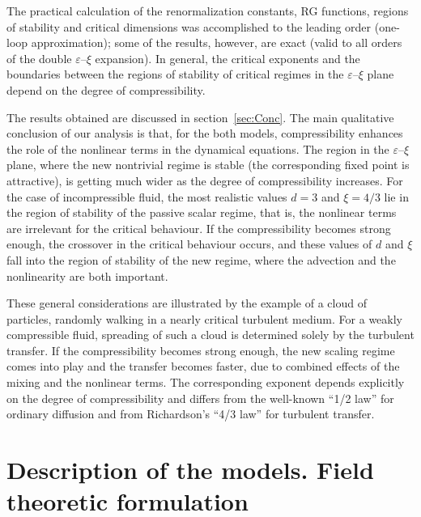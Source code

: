 \documentclass[12pt]{iopart}
\begin{document}
The practical calculation of the renormalization constants, RG functions,
regions of stability and critical dimensions was accomplished to the
leading order (one-loop approximation); some of the results, however, are
exact (valid to all orders of the double $\varepsilon$--$\xi$ expansion).
In general, the critical exponents and the boundaries
between the regions of stability of critical regimes in the
$\varepsilon$--$\xi$ plane depend on the degree of compressibility.

The results obtained are discussed in section~\ref{sec:Conc}.
The main qualitative conclusion of our analysis is that, for the both
models, compressibility enhances the role of the nonlinear terms in the
dynamical equations. The region in the $\varepsilon$--$\xi$ plane, where
the new nontrivial regime is stable (the corresponding fixed point is
attractive), is getting much wider as the degree of compressibility
increases. For the case of incompressible fluid, the most realistic values
$d=3$ and $\xi=4/3$ lie in the region of stability of the passive scalar
regime, that is, the nonlinear terms are irrelevant for the critical
behaviour. If the compressibility becomes strong enough, the crossover
in the critical behaviour occurs, and these values of $d$ and $\xi$
fall into the region of stability of the new regime, where the advection
and the nonlinearity are both important.

These general considerations are illustrated by the example of a cloud
of particles, randomly walking in a nearly critical turbulent medium.
For a weakly compressible fluid, spreading of such a cloud is
determined solely by the turbulent transfer. If the compressibility becomes
strong enough, the new scaling regime comes into play and the transfer
becomes faster, due to combined effects of the mixing and the nonlinear
terms. The corresponding exponent depends explicitly on the degree of
compressibility and differs from the well-known ``1/2 law'' for ordinary
diffusion and from Richardson's ``4/3 law'' for turbulent transfer.


\section{Description of the models. Field theoretic formulation}
\label{sec:QFT}
\end{document}
